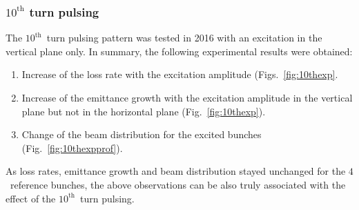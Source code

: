 \documentclass[%
 reprint,
 amsmath,amssymb,
 aps,
prstab,
]{revtex4-1}
\begin{document}
\subsubsection{$10^{\mathrm{th}}$ turn pulsing\label{sec:simex10}}
The $10^{\mathrm{th}}$~turn pulsing pattern was tested in 2016 with an excitation in the vertical plane only. In summary, the following experimental results were obtained:
\begin{enumerate}
	\item Increase of the loss rate with the excitation amplitude (Figs.~\ref{fig:10thexp}.
	\item Increase of the emittance growth with the excitation amplitude in the vertical plane but not in the horizontal plane (Fig.~\ref{fig:10thexp}).
	\item Change of the beam distribution for the excited bunches (Fig.~\ref{fig:10thexpprof}).	
\end{enumerate}
As loss rates, emittance growth and beam distribution stayed unchanged for the $4$~reference bunches, the above observations can be also truly associated with the effect of the $10^{\mathrm{th}}$~turn pulsing.
\end{document}
